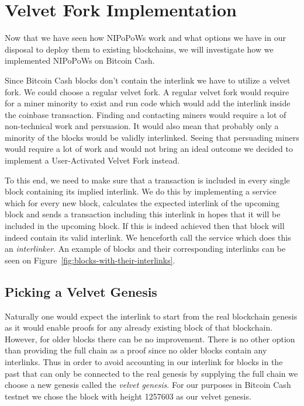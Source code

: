 \chapter{Velvet Fork Implementation}
\label{chap:interlinker}
Now that we have seen how NIPoPoWs work and what options we have in our disposal to deploy them to existing blockchains, we will investigate how we implemented NIPoPoWs on Bitcoin Cash.


Since Bitcoin Cash blocks don't contain the interlink we have to utilize a velvet fork. We could choose a regular velvet fork. A regular velvet fork would require for a miner minority to exist and run code which would add the interlink inside the coinbase transaction. Finding and contacting miners would require a lot of non-technical work and persuasion. It would also mean that probably only a minority of the blocks would be validly interlinked. Seeing that persuading miners would require a lot of work and would not bring an ideal outcome we decided to implement a User-Activated Velvet Fork instead.

To this end, we need to make sure that a transaction is included in every single block containing its implied interlink. We do this by implementing a service which for every new block, calculates the expected interlink of the upcoming block and sends a transaction including this interlink in hopes that it will be included in the upcoming block. If this is indeed achieved then that block will indeed contain its valid interlink. We henceforth call the service which does this an \emph{interlinker}. An example of blocks and their corresponding interlinks can be seen on Figure~\ref{fig:blocks-with-their-interlinks}.

\section{Picking a Velvet Genesis}
Naturally one would expect the interlink to start from the real blockchain genesis as it would enable proofs for any already existing block of that blockchain. However, for older blocks there can be no improvement. There is no other option than providing the full chain as a proof since no older blocks contain any interlinks. Thus in order to avoid accounting in our interlink for blocks in the past that can only be connected to the real genesis by supplying the full chain we choose a new genesis called the \emph{velvet genesis}. For our purposes in Bitcoin Cash testnet we chose the block with height 1257603 as our velvet genesis.

